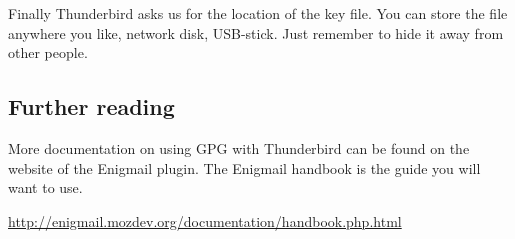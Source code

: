 Finally Thunderbird asks us for the location of the key file. You can
store the file anywhere you like, network disk, USB-stick. Just remember
to hide it away from other people.

\subsection{Further reading}

More documentation on using GPG with Thunderbird can be found on the
website of the Enigmail plugin. The Enigmail handbook is the guide you
will want to use.

\href{http://enigmail.mozdev.org/documentation/handbook.php.html}{http://enigmail.mozdev.org/documentation/handbook.php.html}
